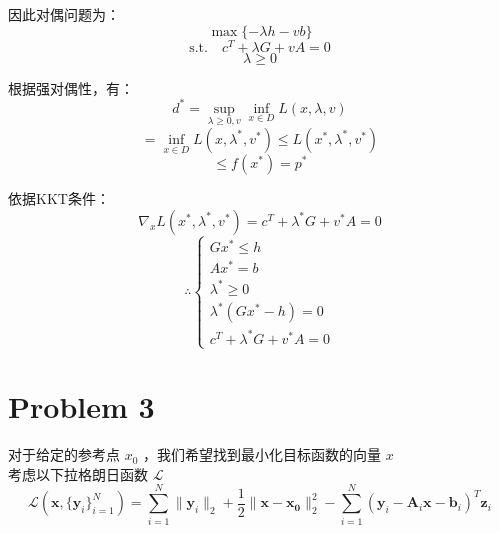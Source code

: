 \documentclass{article}
\begin{document}
因此对偶问题为：
\begin{equation*}
    \max \{-\lambda h - v b\}
\end{equation*}
\begin{equation*}
    \text{s.t.} \quad c^T + \lambda G + v A = 0
\end{equation*}
\begin{equation*}
    \lambda \geq 0
\end{equation*}

根据强对偶性，有：
\begin{equation*}
    d^* = \sup_{\lambda \geq 0, v} \inf_{x \in D} L(x, \lambda, v)
\end{equation*}
\begin{equation*}
    = \inf_{x \in D} L(x, \lambda^*, v^*) \leq L(x^*, \lambda^*, v^*)
\end{equation*}
\begin{equation*}
    \leq f(x^*) = p^*
\end{equation*}

依据KKT条件：
\begin{equation*}
    \nabla_x L(x^*, \lambda^*, v^*) = c^T + \lambda^* G + v^* A = 0
\end{equation*}
\begin{equation*}
    \therefore \begin{cases}
        Gx^* \leq h            \\
        Ax^* = b               \\
        \lambda^* \geq 0       \\
        \lambda^* (Gx^*-h) = 0 \\
        c^T + \lambda^* G + v^* A = 0
    \end{cases}
\end{equation*}

\section*{Problem 3}

对于给定的参考点 $x_0$ ，我们希望找到最小化目标函数的向量 $x$\\
考虑以下拉格朗日函数 $\mathcal{L}$
\begin{equation}
    \mathcal{L}(\mathbf{x}, \{\mathbf{y}_i\}_{i=1}^N) = \sum_{i=1}^{N} \|\mathbf{y}_i\|_2 + \frac{1}{2}\|\mathbf{x} - \mathbf{x_0}\|_2^2 - \sum_{i=1}^{N} (\mathbf{y}_i - \mathbf{A}_i\mathbf{x} - \mathbf{b}_i)^T\mathbf{z}_i
\end{equation}
\end{document}
